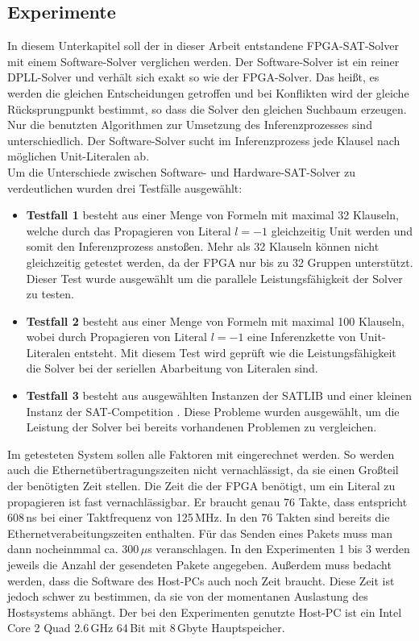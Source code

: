 \subsection{Experimente}
In diesem Unterkapitel soll der in dieser Arbeit entstandene 
FPGA-SAT-Solver mit einem Software-Solver verglichen werden.
Der Software-Solver ist ein reiner DPLL-Solver und 
verhält sich exakt so wie der FPGA-Solver. 
Das heißt, es werden die gleichen Entscheidungen getroffen
und bei Konflikten wird der gleiche Rücksprungpunkt bestimmt,
so dass die Solver den gleichen Suchbaum erzeugen.
Nur die benutzten Algorithmen zur 
Umsetzung des Inferenzprozesses sind unterschiedlich.
Der Software-Solver sucht im Inferenzprozess jede Klausel
nach möglichen Unit-Literalen ab.\\
Um die Unterschiede zwischen Software- und 
Hardware-SAT-Solver zu verdeutlichen wurden
drei Testfälle ausgewählt:
\begin{itemize}
  \item 
    \textbf{Testfall 1} besteht aus einer Menge von Formeln mit maximal 32 Klauseln,  
    welche durch das Propagieren von Literal $l = -1$ gleichzeitig Unit werden und somit 
    den Inferenzprozess anstoßen. Mehr als 32 Klauseln können nicht
    gleichzeitig getestet werden, da der FPGA nur bis zu 32
    Gruppen unterstützt. Dieser Test wurde ausgewählt um die parallele Leistungsfähigkeit
    der Solver zu testen.
  \item
    \textbf{Testfall 2} besteht aus einer Menge von Formeln mit maximal
    100 Klauseln, wobei durch Propagieren von Literal $l = -1$ eine
    Inferenzkette von Unit-Literalen entsteht.
    Mit diesem Test wird geprüft wie die Leistungsfähigkeit die Solver bei
    der seriellen Abarbeitung von Literalen sind.
  \item
    \textbf{Testfall 3} besteht aus ausgewählten Instanzen
    der SATLIB \cite{satlib:2003} und einer kleinen Instanz der SAT-Competition \cite{satcomp:2011}. 
    Diese Probleme wurden ausgewählt, um die Leistung der Solver
    bei bereits vorhandenen Problemen zu vergleichen.
\end{itemize}
Im getesteten System sollen alle Faktoren mit
eingerechnet werden. So werden auch die 
Ethernetübertragungszeiten nicht vernachlässigt, da
sie einen Großteil der benötigten Zeit stellen.
Die Zeit die der FPGA benötigt, um ein Literal
zu propagieren ist fast vernachlässigbar. Er braucht
genau 76 Takte, dass entspricht 608\,ns bei
einer Taktfrequenz von 125\,MHz. In den 76 Takten 
sind bereits die Ethernetverabeitungszeiten
enthalten. Für das Senden eines Pakets muss
man dann nocheinmmal ca. 300\,$\mu$s veranschlagen.
In den Experimenten 1 bis 3 werden jeweils
die Anzahl der gesendeten Pakete angegeben.
Außerdem muss bedacht werden, dass
die Software des Host-PCs auch noch 
Zeit braucht. Diese Zeit ist jedoch schwer
zu bestimmen, da sie von der momentanen Auslastung
des Hostsystems abhängt. Der bei den Experimenten
genutzte Host-PC ist ein Intel Core 2 Quad 2.6\,GHz 
64\,Bit mit 8\,Gbyte Hauptspeicher.



